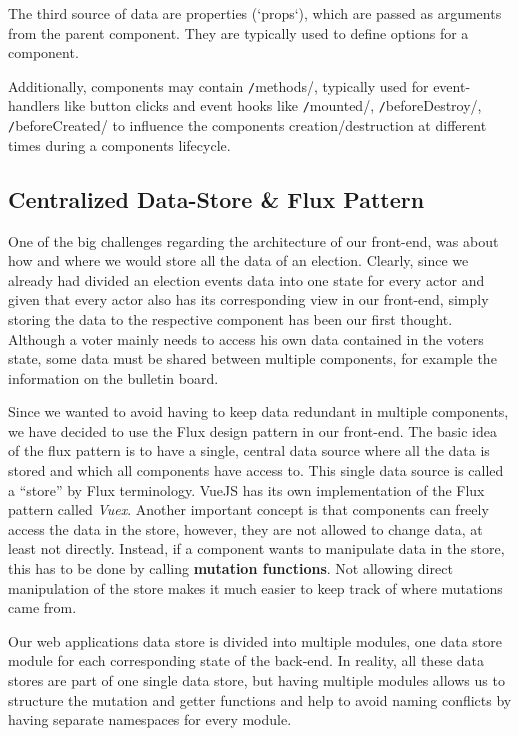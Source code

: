 The third source of data are properties (`props`), which are passed as arguments from the parent component. They are typically used to define options for a component.

Additionally, components may contain \texttt/methods/, typically used for event-handlers like button clicks and event hooks like \texttt/mounted/, \texttt/beforeDestroy/, \texttt/beforeCreated/ to influence the components creation/destruction at different times during a components lifecycle.

\subsection{Centralized Data-Store \& Flux Pattern}
One of the big challenges regarding the architecture of our front-end, was about how and where we would store all the data of an election. Clearly, since we already had divided an election events data into one state for every actor and given that every actor also has its corresponding view in our front-end, simply storing the data to the respective component has been our first thought. Although a voter mainly needs to access his own data contained in the voters state, some data must be shared between multiple components, for example the information on the bulletin board.

Since we wanted to avoid having to keep data redundant in multiple components, we have decided to use the Flux design pattern in our front-end. The basic idea of the flux pattern is to have a single, central data source where all the data is stored and which all components have access to. This single data source is called a "`store"' by Flux terminology. VueJS has its own implementation of the Flux pattern called \textit{Vuex}. Another important concept is that components can freely access the data in the store, however, they are not allowed to change data, at least not directly. Instead, if a component wants to manipulate data in the store, this has to be done by calling \textbf{mutation functions}. Not allowing direct manipulation of the store makes it much easier to keep track of where mutations came from.

Our web applications data store is divided into multiple modules, one data store module for each corresponding state of the back-end. In reality, all these data stores are part of one single data store, but having multiple modules allows us to structure the mutation and getter functions and help to avoid naming conflicts by having separate namespaces for every module.

